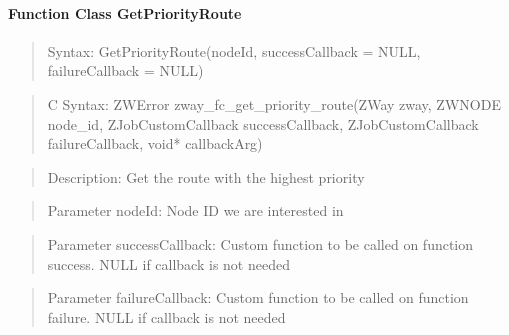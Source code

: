 \paragraph{Function Class GetPriorityRoute}
\begin{quote}Syntax: GetPriorityRoute(nodeId, successCallback = NULL, failureCallback = NULL)\end{quote}
\begin{quote}C Syntax: ZWError zway\_fc\_get\_priority\_route(ZWay zway, ZWNODE node\_id, ZJobCustomCallback successCallback, ZJobCustomCallback failureCallback, void* callbackArg)\end{quote}
\begin{quote}Description: Get the route with the highest priority\end{quote}
\begin{quote}Parameter nodeId: Node ID we are interested in\end{quote}
\begin{quote}Parameter successCallback: Custom function to be called on function success. NULL if callback is not needed\end{quote}
\begin{quote}Parameter failureCallback: Custom function to be called on function failure. NULL if callback is not needed\end{quote}


